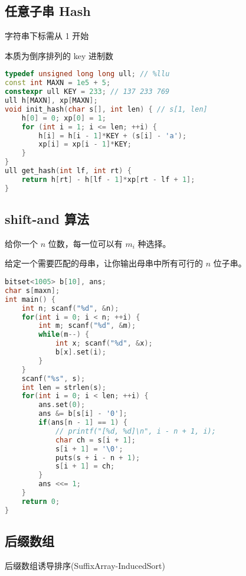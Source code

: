 \subsection{任意子串 Hash}

字符串下标需从 1 开始

本质为倒序排列的 key 进制数

\begin{lstlisting}[language=C++]
typedef unsigned long long ull; // %llu
const int MAXN = 1e5 + 5;
constexpr ull KEY = 233; // 137 233 769
ull h[MAXN], xp[MAXN];
void init_hash(char s[], int len) { // s[1, len]
    h[0] = 0; xp[0] = 1;
    for (int i = 1; i <= len; ++i) {
        h[i] = h[i - 1]*KEY + (s[i] - 'a');
        xp[i] = xp[i - 1]*KEY;
    }
}
ull get_hash(int lf, int rt) {
    return h[rt] - h[lf - 1]*xp[rt - lf + 1];
}
\end{lstlisting}

\subsection{shift-and 算法}

给你一个 $n$ 位数，每一位可以有 $m _ i$ 种选择。

给定一个需要匹配的母串，让你输出母串中所有可行的 $n$ 位子串。

\begin{lstlisting}[language=C++]
bitset<1005> b[10], ans;
char s[maxn];
int main() {
    int n; scanf("%d", &n);
    for(int i = 0; i < n; ++i) {
        int m; scanf("%d", &m);
        while(m--) {
            int x; scanf("%d", &x);
            b[x].set(i);
        }
    }
    scanf("%s", s);
    int len = strlen(s);
    for(int i = 0; i < len; ++i) {
        ans.set(0);
        ans &= b[s[i] - '0'];
        if(ans[n - 1] == 1) {
            // printf("[%d, %d]\n", i - n + 1, i);
            char ch = s[i + 1];
            s[i + 1] = '\0';
            puts(s + i - n + 1);
            s[i + 1] = ch;
        }
        ans <<= 1;
    }
    return 0;
}
\end{lstlisting}

\subsection{后缀数组}

后缀数组诱导排序(SuffixArray-InducedSort)

